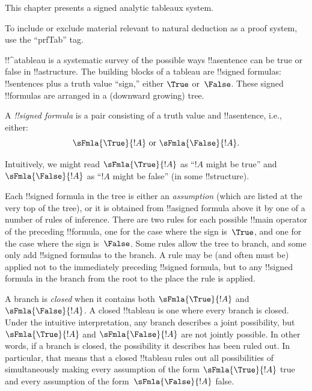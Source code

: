 
\begin{editorial}
This chapter presents a signed analytic tableaux system.
  
To include or exclude material relevant to natural deduction as a
proof system, use the ``prfTab'' tag.
\end{editorial}





!!^a{tableau} is a systematic survey of the possible ways
!!a{sentence} can be true or false in !!a{structure}. The building
blocks of a tableau are !!{signed formula}s: !!{sentence}s plus a
truth value ``sign,'' either $\True$ or~$\False$. These signed
!!{formula}s are arranged in a (downward growing) tree.

\begin{defn}
  A \emph{!!{signed formula}} is a pair consisting of a truth value
  and !!a{sentence}, i.e., either:
  \[
  \sFmla{\True}{!A} \text{ or } \sFmla{\False}{!A}.
  \]
\end{defn}

Intuitively, we might read $\sFmla{\True}{!A}$ as ``$!A$ might be
true'' and $\sFmla{\False}{!A}$ as ``$!A$ might be false'' (in some
!!{structure}).

Each !!{signed formula} in the tree is either an \emph{assumption}
(which are listed at the very top of the tree), or it is obtained from
!!a{signed formula} above it by one of a number of rules of
inference. There are two rules for each possible !!{main operator} of
the preceding !!{formula}, one for the case where the sign is~$\True$,
and one for the case where the sign is~$\False$. Some rules allow the
tree to branch, and some only add !!{signed formula}s to the branch.
A rule may be (and often must be) applied not to the immediately
preceding !!{signed formula}, but to any !!{signed formula} in the
branch from the root to the place the rule is applied.

A branch is \emph{closed} when it contains both $\sFmla{\True}{!A}$
and $\sFmla{\False}{!A}$. A closed !!{tableau} is one where every branch
is closed.  Under the intuitive interpretation, any branch describes a
joint possibility, but $\sFmla{\True}{!A}$ and $\sFmla{\False}{!A}$
are not jointly possible. In other words, if a branch is closed, the
possibility it describes has been ruled out. In particular, that means
that a closed !!{tableau} rules out all possibilities of simultaneously
making every assumption of the form $\sFmla{\True}{!A}$ true and every
assumption of the form~$\sFmla{\False}{!A}$ false.

